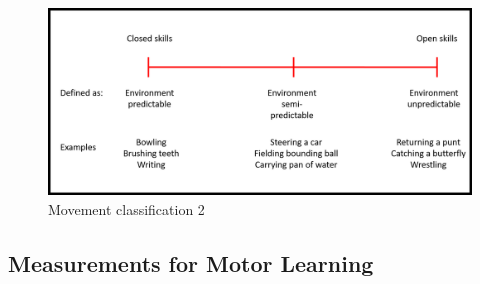 \begin{figure}[htb]
	\centering
	\includegraphics[width=\textwidth]{figures/movement_classification2.png}
	\caption[Movement classification 2]{Movement classification 2 \cite{mlbook}}
	\label{fig:movement_classification2}
\end{figure}

\subsection{Measurements for Motor Learning}
\label{section:measures_for_ml}

